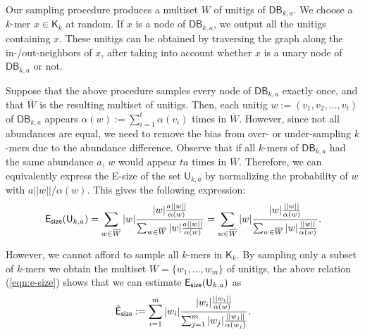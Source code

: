 \documentclass[a4paper,11pt]{article}
\newcommand{\DB}{\mathsf{DB}_{k,a}}
\newcommand{\U}{\mathsf{U}_{k,a}}
\newcommand{\K}{\mathsf{K}}
\newcommand{\abu}{\alpha}
\newcommand{\esize}{{\sf E_{size}}}
\begin{document}
Our sampling procedure produces a multiset $W$ of unitigs of $\DB$. We choose a $k$-mer $x \in \K_k$ at random. If $x$ is a node of $\DB$, we output all the unitigs containing $x$. These unitigs can be obtained by traversing the graph along the in-/out-neighbors of $x$, after taking into account whether $x$ is a unary node of $\DB$ or not. 

Suppose that the above procedure samples every node of $\DB$ exactly once, and that $\overline{W}$ is the resulting multiset of unitigs. Then, each unitig $w := (v_1,v_2,\dots,v_t)$ of $\DB$ appears $\alpha(w) := \sum_{i = 1}^{t}\alpha(v_i)$ times in $\overline{W}$. However, since not all abundances are equal, we need to remove the bias from over- or under-sampling $k$-mers due to the abundance difference. Observe that if all $k$-mers of $\DB$ had the same abundance $a$, $w$ would appear $ta$ times in $\overline{W}$. Therefore, we can equivalently express the E-size of the set $\U$ by normalizing the probability of $w$ with $a||w||/\abu(w)$. This gives the following expression:
\begin{equation}
\esize(\U) = \sum_{w \in \overline{W}} |w| \frac{|w|\frac{a||w||}{\alpha(w)}}{\sum_{w \in \overline{W}}|w|\frac{a||w||}{\alpha(w)}} = \sum_{w \in \overline{W}} |w| \frac{|w|\frac{||w||}{\alpha(w)}}{\sum_{w \in \overline{W}}|w|\frac{||w||}{\alpha(w)}}.
\label{eqn:e-size}
\end{equation}

However, we cannot afford to sample all $k$-mers in $\K_k$. By sampling only a subset of $k$-mers we obtain the multiset $W = \{w_1,\dots,w_m\}$ of unitigs, the above relation (\ref{eqn:e-size}) shows that we can estimate $\esize(\U)$ as 
\[\hat{{\sf E}}_{\sf size} := \sum_{i = 1}^{m} |w_i| \frac{|w_i|\frac{||w_i||}{\alpha(w)}}{\sum_{j=1}^{m}|w_j|\frac{||w_j||}{\alpha(w_j)}}.\]
\end{document}
